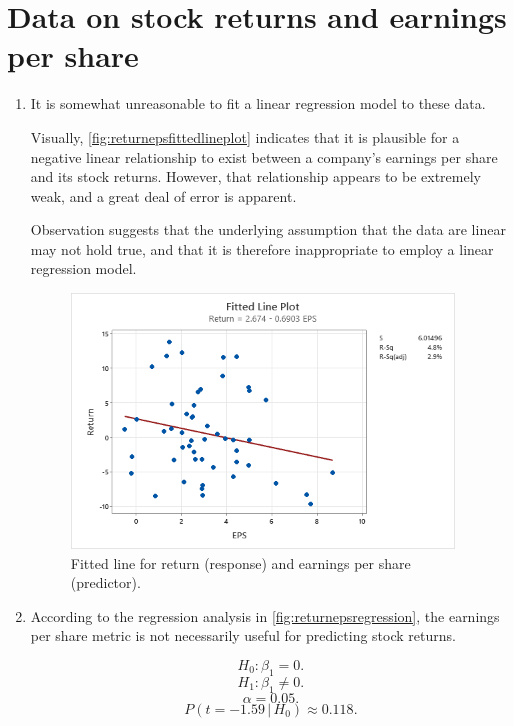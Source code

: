 \documentclass[12pt]{article}
\begin{document}
\section{Data on stock returns and earnings per share}
\begin{enumerate}
\item It is somewhat unreasonable to fit a linear regression model to these data.

Visually, \autoref{fig:returnepsfittedlineplot} indicates that it is plausible for a negative linear relationship to exist between a company's earnings per share and its stock returns. However, that relationship appears to be extremely weak, and a great deal of error is apparent.

Observation suggests that the underlying assumption that the data are linear may not hold true, and that it is therefore inappropriate to employ a linear regression model.
\begin{figure}[h]
\begin{center}
\includegraphics[width=4in]{src/images/return-eps-fitted-line-plot.png}
\end{center}
\caption{Fitted line for return (response) and earnings per share (predictor).\label{fig:returnepsfittedlineplot}}
\end{figure}
\item According to the regression analysis in \autoref{fig:returnepsregression}, the earnings per share metric is not necessarily useful for predicting stock returns.

\[H_0:\beta_1=0.\]
\[H_1:\beta_1\neq 0.\]
\[\alpha=0.05.\]
\[P(t=-1.59\,|\,H_0)\approx 0.118.\]


\end{enumerate}
\end{document}
